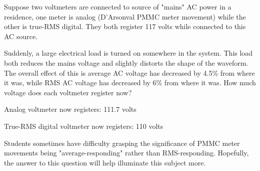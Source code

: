 

Suppose two voltmeters are connected to source of "mains" AC power in a residence, one meter is analog (D'Arsonval PMMC meter movement) while the other is true-RMS digital.  They both register 117 volts while connected to this AC source.  

Suddenly, a large electrical load is turned on somewhere in the system.  This load both reduces the mains voltage and slightly distorts the shape of the waveform.  The overall effect of this is average AC voltage has decreased by 4.5\% from where it was, while RMS AC voltage has decreased by 6\% from where it was.  How much voltage does each voltmeter register now?







Analog voltmeter now registers: 111.7 volts

\vskip 10pt

True-RMS digital voltmeter now registers: 110 volts







Students sometimes have difficulty grasping the significance of PMMC meter movements being "average-responding" rather than RMS-responding.  Hopefully, the answer to this question will help illuminate this subject more.




